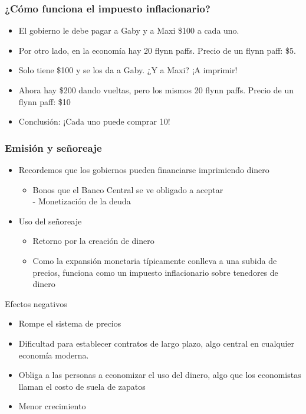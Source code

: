 \documentclass{beamer}
\begin{document}
\begin{frame}
\frametitle{¿Cómo funciona el impuesto inflacionario?}
\begin{itemize}
    \item El gobierno le debe pagar a Gaby y a Maxi \$100 a cada uno. 
    \item Por otro lado, en la economía hay 20 flynn paffs. Precio de un flynn paff: \$5.
    \item Solo tiene \$100 y se los da a Gaby. ¿Y a Maxi? ¡A imprimir!
    \item Ahora hay \$200 dando vueltas, pero los mismos 20 flynn paffs. Precio de un flynn paff: \$10
    \item Conclusión: ¡Cada uno puede comprar 10!
\end{itemize}
\end{frame}

\begin{frame}
\frametitle{Emisión y señoreaje}
\begin{itemize}
    \item Recordemos que los gobiernos pueden financiarse imprimiendo dinero
        \begin{itemize}
        \item Bonos que el Banco Central se ve obligado a aceptar \\
        - Monetización de la deuda
        \end{itemize}
    \vspace{2mm}
    \item Uso del señoreaje
\begin{itemize}
        \item Retorno por la creación de dinero
        \item Como la expansión monetaria típicamente conlleva a una subida de precios, funciona como un impuesto inflacionario sobre tenedores de dinero 
        \end{itemize}
\end{itemize}
\end{frame}

\begin{frame}{Efectos negativos}
    \begin{itemize}
 \item Rompe el sistema de precios
 \item Dificultad para establecer contratos de largo plazo, algo central en cualquier economía moderna.
 \item  Obliga a las personas a economizar el uso del dinero,
algo que los economistas llaman el costo de suela de zapatos
\item Menor crecimiento
  \end{itemize}
\end{frame}
\end{document}
